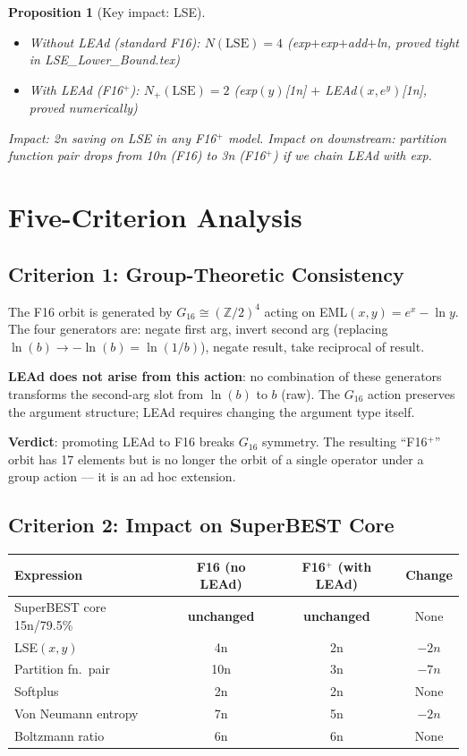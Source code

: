 \documentclass[11pt]{article}
\newtheorem{proposition}[theorem]{Proposition}
\begin{document}
\begin{proposition}[Key impact: LSE]
\begin{itemize}
  \item Without LEAd (standard F16): $N(\mathrm{LSE}) = 4$
    (exp$+$exp$+$add$+$ln, proved tight in LSE\_Lower\_Bound.tex)
  \item With LEAd (F16$^+$): $N_+(\mathrm{LSE}) = 2$
    (exp$(y)$[1n] $+$ LEAd$(x, e^y)$[1n], proved numerically)
\end{itemize}
Impact: 2n saving on LSE in any F16$^+$ model.
Impact on downstream: partition function pair drops from 10n (F16) to 3n (F16$^+$)
if we chain LEAd with exp.
\end{proposition}

\section{Five-Criterion Analysis}

\subsection{Criterion 1: Group-Theoretic Consistency}

The F16 orbit is generated by $G_{16} \cong (\mathbb{Z}/2)^4$ acting on
EML$(x,y) = e^x - \ln y$. The four generators are:
negate first arg, invert second arg (replacing $\ln(b) \to -\ln(b) = \ln(1/b)$),
negate result, take reciprocal of result.

\textbf{LEAd does not arise from this action}: no combination of these generators
transforms the second-arg slot from $\ln(b)$ to $b$ (raw).
The $G_{16}$ action preserves the argument structure; LEAd requires changing
the argument type itself.

\textbf{Verdict}: promoting LEAd to F16 breaks $G_{16}$ symmetry.
The resulting ``F16$^+$'' orbit has 17 elements but is no longer the orbit of a
single operator under a group action — it is an ad hoc extension.

\subsection{Criterion 2: Impact on SuperBEST Core}

\begin{center}
\renewcommand{\arraystretch}{1.2}
\begin{tabular}{lccc}
\toprule
Expression & F16 (no LEAd) & F16$^+$ (with LEAd) & Change \\
\midrule
SuperBEST core 15n/79.5\% & \textbf{unchanged} & \textbf{unchanged} & None \\
LSE$(x,y)$ & 4n & 2n & $-2n$ \\
Partition fn.\ pair & 10n & 3n & $-7n$ \\
Softplus & 2n & 2n & None \\
Von Neumann entropy & 7n & 5n & $-2n$ \\
Boltzmann ratio & 6n & 6n & None \\
\bottomrule
\end{tabular}
\end{center}
\end{document}
